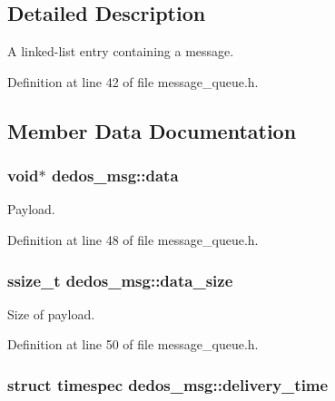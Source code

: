 \subsection{Detailed Description}
A linked-\/list entry containing a message. 

Definition at line 42 of file message\-\_\-queue.\-h.



\subsection{Member Data Documentation}
\hypertarget{structdedos__msg_a91f31ca1c757b98cbc2de7bf7c18cb49}{
\subsubsection[{data}]{\setlength{\rightskip}{0pt plus 5cm}void$\ast$ dedos\-\_\-msg\-::data}}\label{structdedos__msg_a91f31ca1c757b98cbc2de7bf7c18cb49}


Payload. 



Definition at line 48 of file message\-\_\-queue.\-h.

\hypertarget{structdedos__msg_a336dcb0b72f421b1e99dc23f76d4bcd1}{
\subsubsection[{data\-\_\-size}]{\setlength{\rightskip}{0pt plus 5cm}ssize\-\_\-t dedos\-\_\-msg\-::data\-\_\-size}}\label{structdedos__msg_a336dcb0b72f421b1e99dc23f76d4bcd1}


Size of payload. 



Definition at line 50 of file message\-\_\-queue.\-h.

\hypertarget{structdedos__msg_a178267be123a7471f2ec7e4a74d598fd}{
\subsubsection[{delivery\-\_\-time}]{\setlength{\rightskip}{0pt plus 5cm}struct timespec dedos\-\_\-msg\-::delivery\-\_\-time}}\label{structdedos__msg_a178267be123a7471f2ec7e4a74d598fd}


